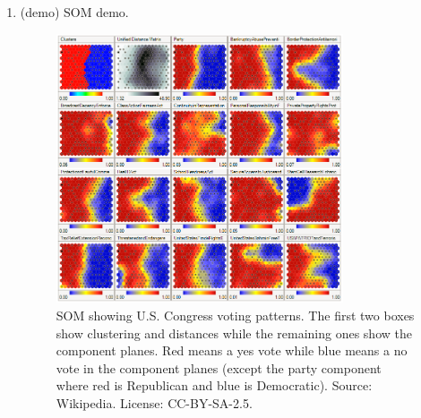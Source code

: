 \begin{enumerate}
\begin{solution}
  \end{solution}

\item (demo) SOM demo.

  \begin{solution}
    \begin{figure}[h]
      \centering
      \includegraphics[width=0.8\textwidth]{som_demo.png}
      \caption{SOM showing U.S. Congress voting patterns. The first
        two boxes show clustering and distances while the remaining
        ones show the component planes. Red means a yes vote while
        blue means a no vote in the component planes (except the party
        component where red is Republican and blue is
        Democratic). {\scriptsize Source: Wikipedia. License:
          CC-BY-SA-2.5.}}
    \end{figure}
  \end{solution}

\end{enumerate}

